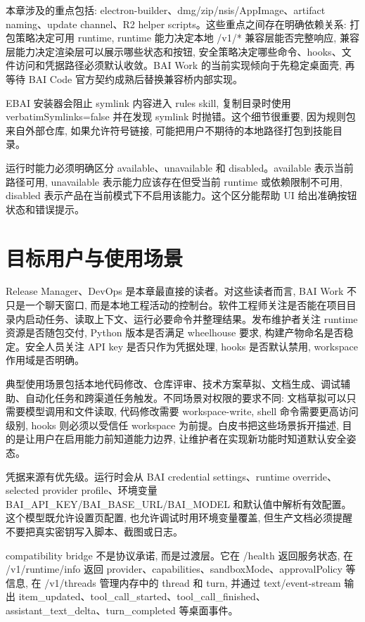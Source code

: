 本章涉及的重点包括: electron-builder、dmg/zip/nsis/AppImage、artifact naming、update channel、R2 helper scripts。这些重点之间存在明确依赖关系: 打包策略决定可用 runtime, runtime 能力决定本地 /v1/* 兼容层能否完整响应, 兼容层能力决定渲染层可以展示哪些状态和按钮, 安全策略决定哪些命令、hooks、文件访问和凭据路径必须默认收敛。BAI Work 的当前实现倾向于先稳定桌面壳, 再等待 BAI Code 官方契约成熟后替换兼容桥内部实现。

EBAI 安装器会阻止 symlink 内容进入 rules skill, 复制目录时使用 verbatimSymlinks=false 并在发现 symlink 时抛错。这个细节很重要, 因为规则包来自外部仓库, 如果允许符号链接, 可能把用户不期待的本地路径打包到技能目录。

运行时能力必须明确区分 available、unavailable 和 disabled。available 表示当前路径可用, unavailable 表示能力应该存在但受当前 runtime 或依赖限制不可用, disabled 表示产品在当前模式下不启用该能力。这个区分能帮助 UI 给出准确按钮状态和错误提示。

\section{目标用户与使用场景}
Release Manager、DevOps 是本章最直接的读者。对这些读者而言, BAI Work 不只是一个聊天窗口, 而是本地工程活动的控制台。软件工程师关注是否能在项目目录内启动任务、读取上下文、运行必要命令并整理结果。发布维护者关注 runtime 资源是否随包交付, Python 版本是否满足 wheelhouse 要求, 构建产物命名是否稳定。安全人员关注 API key 是否只作为凭据处理, hooks 是否默认禁用, workspace 作用域是否明确。

典型使用场景包括本地代码修改、仓库评审、技术方案草拟、文档生成、调试辅助、自动化任务和跨渠道任务触发。不同场景对权限的要求不同: 文档草拟可以只需要模型调用和文件读取, 代码修改需要 workspace-write, shell 命令需要更高访问级别, hooks 则必须以受信任 workspace 为前提。白皮书把这些场景拆开描述, 目的是让用户在启用能力前知道能力边界, 让维护者在实现新功能时知道默认安全姿态。

凭据来源有优先级。运行时会从 BAI credential settings、runtime override、selected provider profile、环境变量 BAI\_API\_KEY/BAI\_BASE\_URL/BAI\_MODEL 和默认值中解析有效配置。这个模型既允许设置页配置, 也允许调试时用环境变量覆盖, 但生产文档必须提醒不要把真实密钥写入脚本、截图或日志。

compatibility bridge 不是协议承诺, 而是过渡层。它在 /health 返回服务状态, 在 /v1/runtime/info 返回 provider、capabilities、sandboxMode、approvalPolicy 等信息, 在 /v1/threads 管理内存中的 thread 和 turn, 并通过 text/event-stream 输出 item\_updated、tool\_call\_started、tool\_call\_finished、assistant\_text\_delta、turn\_completed 等桌面事件。

